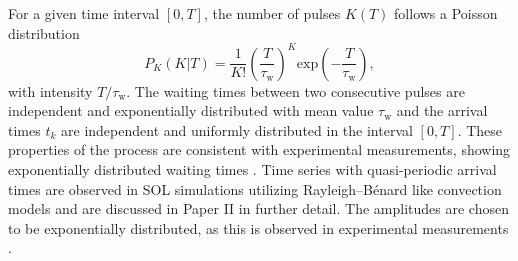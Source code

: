 For a given time interval $[0,T]$, the number of pulses $K(T)$ follows a Poisson distribution \begin{equation}
	P_K(K|T) = \frac{1}{K!} \left(\frac{T}{\tau_\mathrm{w}}\right)^K \textrm{exp}\left(-\frac{T}{\tau_\mathrm{w}}\right),
\end{equation}
with intensity $T/\tau_\mathrm{w}$. The waiting times between two consecutive pulses are independent and exponentially distributed with mean value $\tau_\mathrm{w}$ and the arrival times $t_k$ are independent and uniformly distributed in the interval $[0,T]$. These properties of the process are consistent with experimental measurements, showing exponentially distributed waiting times \cite{garcia2015intermittent,kube2018intermittent,garcia2017sol,garcia2018intermittent}. Time series with quasi-periodic arrival times are observed in SOL simulations utilizing Rayleigh–Bénard like convection models \cite{decristoforo2020intermittent} and are discussed in Paper II in further detail. The amplitudes are chosen to be exponentially distributed, as this is observed in experimental measurements \cite{kube2018intermittent,garcia2017sol,garcia2018intermittent}.


